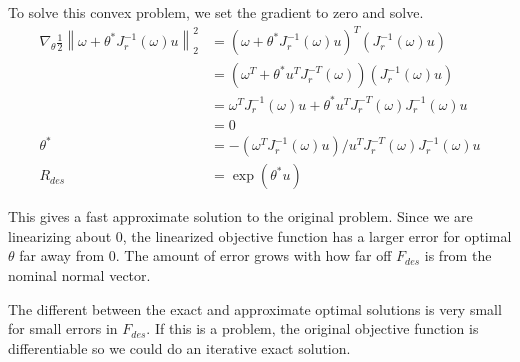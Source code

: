 \documentclass[11pt]{article}
\newcommand{\norm}[1]{\left\lVert#1\right\rVert}
\begin{document}
To solve this convex problem, we set the gradient to zero and solve.
\begin{align}
\nabla_\theta \frac{1}{2}\norm{\omega + \theta^* J_r^{-1}(\omega)u}_2^2 &= (\omega + \theta^* J_r^{-1}(\omega)u)^T(J_r^{-1}(\omega)u)\\
	&=(\omega^T + \theta^* u^TJ_r^{-T}(\omega))(J_r^{-1}(\omega)u)\\ 
	&= \omega^TJ_r^{-1}(\omega)u + \theta^* u^TJ_r^{-T}(\omega)J_r^{-1}(\omega)u\\
	&= 0\\
\theta^* &= -(\omega^TJ_r^{-1}(\omega)u)/u^TJ_r^{-T}(\omega)J_r^{-1}(\omega)u\\
R_{des} &= \exp(\theta^* u)
\end{align}

This gives a fast approximate solution to the original problem. Since we are linearizing about 0, the linearized objective function has a larger error for optimal $\theta$ far away from 0. The amount of error grows with how far off $F_{des}$ is from the nominal normal vector.

The different between the exact and approximate optimal solutions is very small for small errors in $F_{des}$. If this is a problem, the original objective function is differentiable so we could do an iterative exact solution. 
\end{document}
